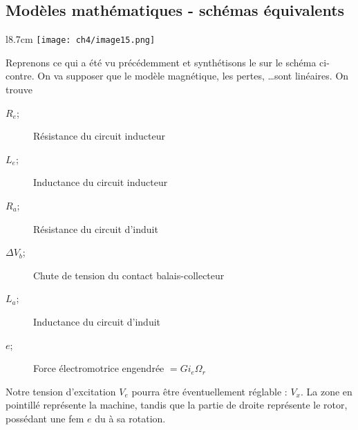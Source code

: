 	\subsection{Modèles mathématiques - schémas équivalents}
		\begin{wrapfigure}[10]{l}{8.7cm}
	\texttt{[image: ch4/image15.png]}
	\end{wrapfigure}
	Reprenons ce qui a été vu précédemment et synthétisons le sur le schéma ci-contre. 
	On va supposer que le modèle magnétique, les pertes, \dots sont linéaires. On 
	trouve 
	\begin{description}
	\item[$R_e$;] Résistance du circuit inducteur
	\item[$L_e$;] Inductance du circuit inducteur
	\item[$R_a$;] Résistance du circuit d'induit
	\item[$\Delta V_b$;] Chute de tension du contact balais-collecteur
	\item[$L_a$;] Inductance du circuit d'induit
	\item[$e$;] Force électromotrice engendrée $= Gi_e\Omega_r$
\end{description}		
	Notre tension d'excitation $V_e$ pourra être éventuellement réglable : $V_x$. La 
	zone en pointillé représente la machine, tandis que la partie de droite représente 
	le rotor, possédant une fem $e$ du à sa rotation.\\
	
